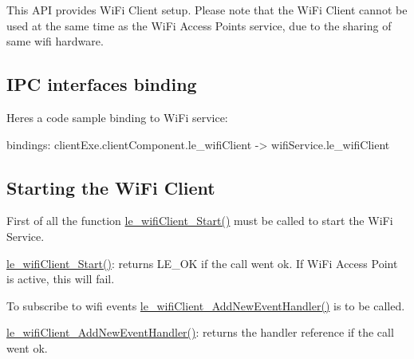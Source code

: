 This A\+PI provides Wi\+Fi Client setup. Please note that the Wi\+Fi Client cannot be used at the same time as the Wi\+Fi Access Points service, due to the sharing of same wifi hardware.\hypertarget{c_le_wifi_client_le_wifi_binding}{}\subsection{I\+P\+C interfaces binding}\label{c_le_wifi_client_le_wifi_binding}
Here\textquotesingle{}s a code sample binding to Wi\+Fi service\+: \begin{DoxyVerb}bindings:
{
   clientExe.clientComponent.le_wifiClient -> wifiService.le_wifiClient
}
\end{DoxyVerb}
\hypertarget{c_le_wifi_client_le_wifiClient_Start}{}\subsection{Starting the Wi\+Fi Client}\label{c_le_wifi_client_le_wifiClient_Start}
First of all the function \hyperlink{le__wifi_client__interface_8h_af637c17f5b8331b598dcf6c57b9260ad}{le\+\_\+wifi\+Client\+\_\+\+Start()} must be called to start the Wi\+Fi Service.
\begin{DoxyItemize}
\item \hyperlink{le__wifi_client__interface_8h_af637c17f5b8331b598dcf6c57b9260ad}{le\+\_\+wifi\+Client\+\_\+\+Start()}\+: returns L\+E\+\_\+\+OK if the call went ok. If Wi\+Fi Access Point is active, this will fail.
\end{DoxyItemize}

To subscribe to wifi events \hyperlink{le__wifi_client__interface_8h_a55aaafbc0a0b4a70faafb50f6babf482}{le\+\_\+wifi\+Client\+\_\+\+Add\+New\+Event\+Handler()} is to be called.
\begin{DoxyItemize}
\item \hyperlink{le__wifi_client__interface_8h_a55aaafbc0a0b4a70faafb50f6babf482}{le\+\_\+wifi\+Client\+\_\+\+Add\+New\+Event\+Handler()}\+: returns the handler reference if the call went ok.
\end{DoxyItemize}


